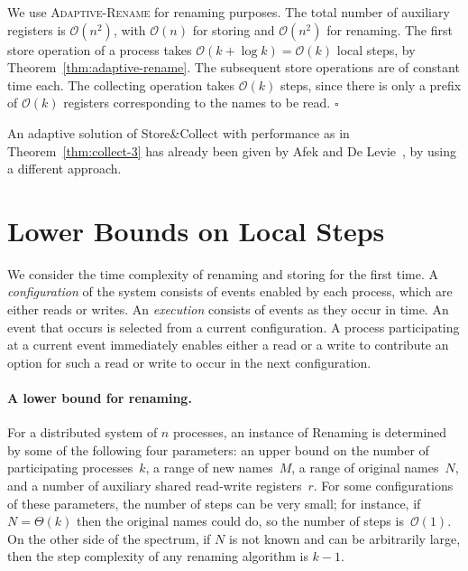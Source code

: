 \documentclass[11pt]{article}
\newcommand{\BBB}{\vspace*{-\bigskipamount}}
\newcommand{\cO}{\mathcal{O}}
\newcommand{\Paragraph}[1]{\BBB\paragraph{#1}}
\newcommand{\qed}{\hfill $\square$ \smallbreak}
\newenvironment{proof}{\noindent{\bf Proof:}}{\qed}
\begin{document}
\begin{proof}
We use  \textsc{Adaptive-Rename} for renaming purposes.
The total number of auxiliary registers is $\cO(n^2)$, with $\cO(n)$ for storing and $\cO(n^2)$ for renaming. 
The first store operation of a process takes $\cO(k+\log k)=\cO(k)$ local steps, by Theorem~\ref{thm:adaptive-rename}.
The subsequent store operations are of constant time each.
The collecting operation takes $\cO(k)$ steps, since there is only a prefix of $\cO(k)$ registers corresponding to the names to be read. 
\end{proof}

An adaptive solution of Store\&Collect with performance as in Theorem~\ref{thm:collect-3} has already been given by Afek and De Levie~\cite{AfekL07}, by using a different approach.





\section{Lower Bounds on Local Steps}





We consider the time complexity of renaming and storing for the first time.
A \emph{configuration} of the system consists of events enabled by each process, which are either reads or writes. 
An \emph{execution} consists of events as they occur in time.
An event that occurs is selected from a current configuration. 
A process participating at a current event immediately enables either a read or a  write to contribute an option for such a read or write to occur in the next configuration.




\Paragraph{A lower bound for renaming.}


For a distributed system of $n$ processes, an instance of Renaming  is determined by some of the following four  parameters: an upper bound on the number of participating processes~$k$, a range of new names~$M$, a range of original names~$N$, and a number of auxiliary shared read-write registers~$r$.
For some configurations of these parameters, the number of steps can be very small; for instance,  if $N=\Theta(k)$ then the original names could do, so the number of steps is~$\cO(1)$. 
On the other side of the spectrum, if $N$ is not known and can be arbitrarily large, then the step complexity of any renaming algorithm is $k-1$.
\end{document}
